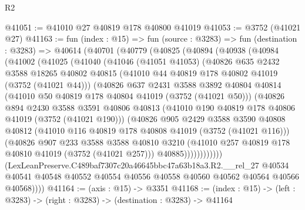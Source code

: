 \begin{lexlean}{R2}
\begin{coremodule}
@41051 := @41010 @27 @40819 @178 @40800 @41019
@41053 := @3752 (@41021 @27)
@41163 := fun (index : @15) =>
  fun (source : @3283) =>
  fun (destination : @3283) =>
  @40614
    (@40701
      (@40779
        (@40825
          (@40894
            (@40938
              (@40984
                (@41002
                  (@41025
                    (@41040
                      (@41046
                        (@41051 @41053)
                        (@40826
                          @635
                          @2432
                          @3588
                          @18265
                          @40802
                          @40815
                          (@41010 @44 @40819 @178 @40802 @41019 (@3752 (@41021 @44)))
                          (@40826
                            @637
                            @2431
                            @3588
                            @3892
                            @40804
                            @40814
                            (@41010 @50 @40819 @178 @40804 @41019 (@3752 (@41021 @50)))
                            (@40826
                              @894
                              @2430
                              @3588
                              @3591
                              @40806
                              @40813
                              (@41010 @190 @40819 @178 @40806 @41019 (@3752 (@41021 @190)))
                              (@40826
                                @905
                                @2429
                                @3588
                                @3590
                                @40808
                                @40812
                                (@41010 @116 @40819 @178 @40808 @41019 (@3752 (@41021 @116)))
                                (@40826
                                  @907
                                  @233
                                  @3588
                                  @3588
                                  @40810
                                  @3210
                                  (@41010 @257 @40819 @178 @40810 @41019 (@3752 (@41021 @257)))
                                  @40885))))))))))))
          (LexLeanPreserve.C489baf7307c20a46645bbc47a63b18a3.R2.__rel_27
            @40534
            @40541
            @40548
            @40552
            @40554
            @40556
            @40558
            @40560
            @40562
            @40564
            @40566
            @40568))))
@41164 := (axis : @15) -> @3351
@41168 := (index : @15) -> (left : @3283) -> (right : @3283) -> (destination : @3283) -> @41164

\end{coremodule}
\end{lexlean}
